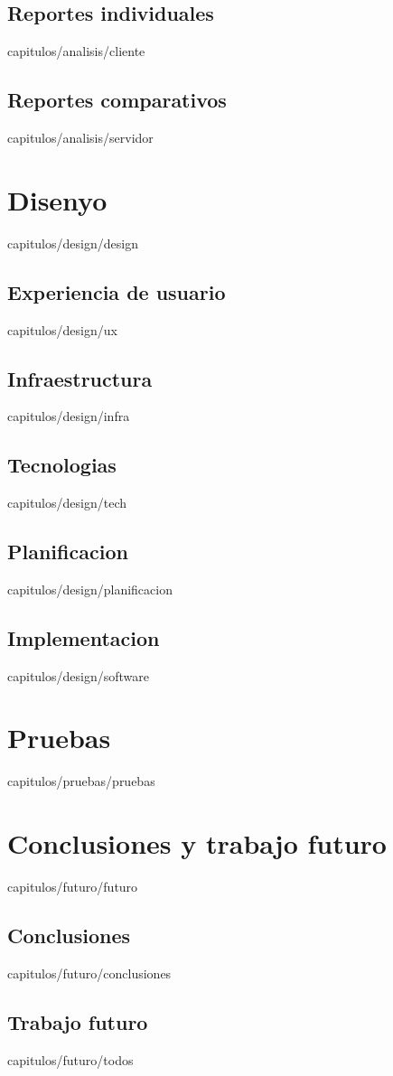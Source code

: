 \documentclass[epsbased,copyright,final,printable,covers,extendedindex,firstnumbered,tfg,gnuplot]{thesis}
\begin{document}
  \section{Reportes individuales\label{SEC:CLIENTE}}{capitulos/analisis/cliente}
  \section{Reportes comparativos\label{SEC:SERVIDOR}}{capitulos/analisis/servidor}

\chapter{Disenyo\label{CAP:DESIGN}}{capitulos/design/design}
  \section{Experiencia de usuario\label{SEC:UX}}{capitulos/design/ux}
  \section{Infraestructura\label{SEC:INFRA}}{capitulos/design/infra}
  \section{Tecnologias\label{SEC:TECH}}{capitulos/design/tech}
  \section{Planificacion\label{SEC:PLANIFICACION}}{capitulos/design/planificacion}
  \section{Implementacion\label{SEC:SOFTWARE}}{capitulos/design/software}

\chapter{Pruebas\label{CAP:PRUEBAS}}{capitulos/pruebas/pruebas}

\chapter{Conclusiones y trabajo futuro\label{CAP:FUTURO}}{capitulos/futuro/futuro}
  \section{Conclusiones\label{SEC:CONCLUSIONES}}{capitulos/futuro/conclusiones}
  \section{Trabajo futuro\label{SEC:TODOS}}{capitulos/futuro/todos}
\end{document}
